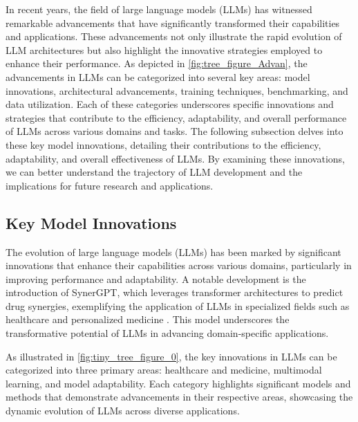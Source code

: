 In recent years, the field of large language models (LLMs) has witnessed remarkable advancements that have significantly transformed their capabilities and applications. These advancements not only illustrate the rapid evolution of LLM architectures but also highlight the innovative strategies employed to enhance their performance. As depicted in \autoref{fig:tree_figure_Advan}, the advancements in LLMs can be categorized into several key areas: model innovations, architectural advancements, training techniques, benchmarking, and data utilization. Each of these categories underscores specific innovations and strategies that contribute to the efficiency, adaptability, and overall performance of LLMs across various domains and tasks. The following subsection delves into these key model innovations, detailing their contributions to the efficiency, adaptability, and overall effectiveness of LLMs. By examining these innovations, we can better understand the trajectory of LLM development and the implications for future research and applications.









\subsection{Key Model Innovations} \label{subsec:Key Model Innovations}

The evolution of large language models (LLMs) has been marked by significant innovations that enhance their capabilities across various domains, particularly in improving performance and adaptability. A notable development is the introduction of SynerGPT, which leverages transformer architectures to predict drug synergies, exemplifying the application of LLMs in specialized fields such as healthcare and personalized medicine \cite{edwards2023synergptincontextlearningpersonalized}. This model underscores the transformative potential of LLMs in advancing domain-specific applications.

As illustrated in \autoref{fig:tiny_tree_figure_0}, the key innovations in LLMs can be categorized into three primary areas: healthcare and medicine, multimodal learning, and model adaptability. Each category highlights significant models and methods that demonstrate advancements in their respective areas, showcasing the dynamic evolution of LLMs across diverse applications.

